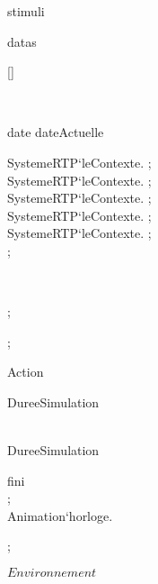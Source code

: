 \begin{op}[e]{stimuli}%
\signature{() \Oto ()}
\parms{}
\begin{blockstmt}
\If  \Len datas 
\Then \\
\begin{blockstmt}
\begin{dclstmt}
[{}]
\end{dclstmt}
\begin{letstmt}
\end{letstmt} \\
\begin{blockstmt}
\If date \Le dateActuelle
\Then \\
\begin{blockstmt}
SystemeRTP`leContexte. ; \\
SystemeRTP`leContexte. ; \\
SystemeRTP`leContexte. ; \\
SystemeRTP`leContexte. ; \\
SystemeRTP`leContexte. ; \\
 ; \\
\return{\mbox{}}
\end{blockstmt}
\Fi
\end{blockstmt}
\end{blockstmt}
\Else \\
\begin{blockstmt}
 ; \\
\return{\mbox{}}
\end{blockstmt}
\Fi
\end{blockstmt};
\end{op}
\begin{op}[e]{Action}%
\signature{() \Oto ()}
\parms{}
\begin{blockstmt}
\If {} \NumLt DureeSimulation
\Then \\
\Else \\
\Fi
\end{blockstmt}
\end{op}
\kThreadDef
\begin{thread}
\begin{blockstmt}
\begin{while}{ \NumLt DureeSimulation}
\begin{blockstmt}
\If  \Not fini
\Then \\
\Fi ; \\
Animation`horloge.
\end{blockstmt}
\end{while} ; \\
\end{blockstmt}
\end{thread}
\kSync
{}
\kEnd $Environnement$


